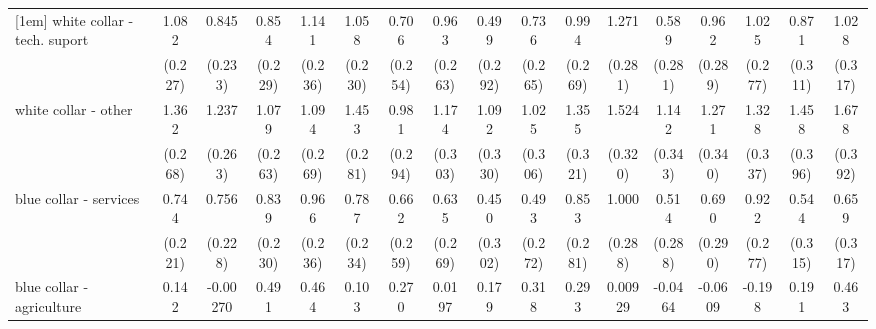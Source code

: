 {\begin{tabular}{l*{16}{c}}
[1em]
white collar - tech. suport&       1.082\sym{***}&       0.845\sym{***}&       0.854\sym{***}&       1.141\sym{***}&       1.058\sym{***}&       0.706\sym{**} &       0.963\sym{***}&       0.499         &       0.736\sym{**} &       0.994\sym{***}&       1.271\sym{***}&       0.589\sym{*}  &       0.962\sym{***}&       1.025\sym{***}&       0.871\sym{**} &       1.028\sym{**} \\
                    &     (0.227)         &     (0.233)         &     (0.229)         &     (0.236)         &     (0.230)         &     (0.254)         &     (0.263)         &     (0.292)         &     (0.265)         &     (0.269)         &     (0.281)         &     (0.281)         &     (0.289)         &     (0.277)         &     (0.311)         &     (0.317)         \\
[1em]
white collar - other&       1.362\sym{***}&       1.237\sym{***}&       1.079\sym{***}&       1.094\sym{***}&       1.453\sym{***}&       0.981\sym{***}&       1.174\sym{***}&       1.092\sym{***}&       1.025\sym{***}&       1.355\sym{***}&       1.524\sym{***}&       1.142\sym{***}&       1.271\sym{***}&       1.328\sym{***}&       1.458\sym{***}&       1.678\sym{***}\\
                    &     (0.268)         &     (0.263)         &     (0.263)         &     (0.269)         &     (0.281)         &     (0.294)         &     (0.303)         &     (0.330)         &     (0.306)         &     (0.321)         &     (0.320)         &     (0.343)         &     (0.340)         &     (0.337)         &     (0.396)         &     (0.392)         \\
[1em]
blue collar - services&       0.744\sym{***}&       0.756\sym{***}&       0.839\sym{***}&       0.966\sym{***}&       0.787\sym{***}&       0.662\sym{*}  &       0.635\sym{*}  &       0.450         &       0.493         &       0.853\sym{**} &       1.000\sym{***}&       0.514         &       0.690\sym{*}  &       0.922\sym{***}&       0.544         &       0.659\sym{*}  \\
                    &     (0.221)         &     (0.228)         &     (0.230)         &     (0.236)         &     (0.234)         &     (0.259)         &     (0.269)         &     (0.302)         &     (0.272)         &     (0.281)         &     (0.288)         &     (0.288)         &     (0.290)         &     (0.277)         &     (0.315)         &     (0.317)         \\
[1em]
blue collar - agriculture&       0.142         &    -0.00270         &       0.491         &       0.464         &       0.103         &       0.270         &      0.0197         &       0.179         &       0.318         &       0.293         &     0.00929         &     -0.0464         &     -0.0609         &      -0.198         &       0.191         &       0.463         \\

\end{tabular}}

